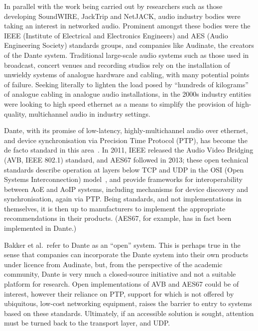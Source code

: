 In parallel with the work being carried out by researchers such as those
developing SoundWIRE, JackTrip and NetJACK, audio industry bodies were taking
an interest in networked audio.
Prominent amongst these bodies were the IEEE (Institute of Electrical and
Electronics Engineers) and AES (Audio Engineering Society) standards groups,
and companies like Audinate, the creators of the Dante system.
Traditional large-scale audio systems such as those used in broadcast, concert
venues and recording studios rely on the installation of unwieldy systems of
analogue hardware and cabling, with many potential points of failure.
Seeking literally to lighten the load posed by ``hundreds of
kilograms''~\citep{bakker_introduction_2014} of analogue cabling in analogue
audio installations, in the 2000s industry entities were looking to high speed
ethernet as a means to simplify the provision of high-quality, multichannel
audio in industry settings.

Dante, with its promise of low-latency, highly-multichannel audio over ethernet,
and device synchronisation via Precision Time Protocol (PTP), has become the de
facto standard in this area~\citep{bakker_introduction_2014}.
In 2011, IEEE released the Audio Video Bridging (AVB, IEEE 802.1) standard,
and AES67 followed in 2013; these open technical standards describe operation
at layers below TCP and UDP in the OSI (Open Systems Interconnection)
model~\citep{}, and provide frameworks for
interoperability between AoE and AoIP systems, including mechanisms for device
discovery and synchronisation, again via PTP\@.
Being standards, and not implementations in themselves, it is then up to
manufacturers to implement the appropriate recommendations in their products.
(AES67, for example, has in fact been implemented in Dante.)

Bakker et al.\ refer to Dante as an ``open'' system.
This is perhaps true in the sense that companies can incorporate the Dante
system into their own products under licence from Audinate, but, from the
perspective of the academic community, Dante is very much a closed-source
initiative and not a suitable platform for research.
Open implementations of AVB and AES67 could be of interest, however their
reliance on PTP, support for which is not offered by ubiquitous, low-cost
networking equipment, raises the barrier to entry to systems based on these
standards.
Ultimately, if an accessible solution is sought, attention must be turned back
to the transport layer, and UDP\@.

